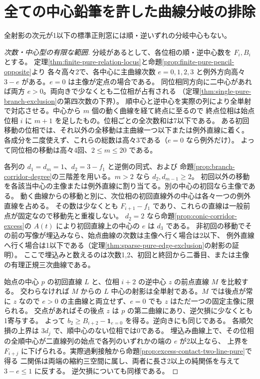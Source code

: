 \section{全ての中心鉛筆を許した曲線分岐の排除}
\label{sec:unrestricted-corridor-exclusion}
\begin{theorem}\label{thm:unrestricted-corridor-exclusion}
全射影の次元が1以下の標準正則窓には順・逆いずれの分岐中心もない。
\end{theorem}
\begin{proof}[次数・中心型の有限な範囲]
分岐があるとして、各位相の順・逆中心数を $F_i,B_i$ とする。
定理\ref{thm:finite-pure-relation-locus}と命題\ref{prop:finite-pure-pencil-opposite}より
各々高々2で、各中心に主曲線次数 $e=0,1,2,3$ と例外方向高々 $3-e$ がある。$e=0$ は主像が定点の場合である。
同位相同方向に二中心があれば両方 $e>0$。両向きで少なくとも二位相が占有される
（定理\ref{thm:single-pure-branch-exclusion}の第四次数の下界）。
順中心と逆中心を実際の列により全単射で対応させる。中心から $m$ 個の動く曲線を経て終点に至るので
終点位相は始点位相 $i$ に $m+1$ を足したもの。位相ごとの全次数和は7以下である。
ある初回移動の位相では、それ以外の全移動は主曲線一つ以下または例外直線に着く。
各成分を二度使えず、これらの総数は高々3である（$e=0$ なら例外だけ）。
よって同位相の移動は高々4回、$2\le m\le20$ である。

各列の $d_1=d_m=1$、$d_2=3-f_1$ と逆側の同式、および
命題\ref{prop:branch-corridor-degree}の三階差を用いる。$m>2$ なら $d_2,d_{m-1}\ge2$。
初回以外の移動を各該当中心の主像または例外直線に割り当てる。別の中心の初回なら主像である。
動く曲線からの移動と別に、次位相の初回直線外の中心は各々一つの例外直線を占める。
その数は少なくとも $F_{i+1}-f_1$ であり、これらの直線は一般前点が固定なので移動先と重複しない。
$d_2=2$ なら命題\ref{prop:conic-corridor-excess}の $A(t)$ により初回直線上の中心の $e$ は $d_3$ である。
非初回の移動でその前の写像が埋込みなら、始点曲線の次数は主像へ行く場合は2以下、
例外直線へ行く場合は1以下である（定理\ref{thm:sparse-pure-edge-exclusion}の射影の証明）。
ここで埋込みと数えるのは次数1,2、初回と終回から二番目、または主像の有理正規三次曲線である。

始点の中心 $p$ の初回直線 $L$ と、位相 $i+2$ の逆中心 $z$ の前点直線 $M$ を比較する。
交わらなければ $M$ からの $L$ 中心の射影は全単射である。$M$ では後点が常に $z$ なので
$e>0$ の主曲線と両立せず、$e=0$ でも $z$ はただ一つの固定主像に限られる。
交点があればその後点 $z$ は $p$ の第二曲線にあり、逆欠損に少なくとも1寄与する。
よって $b_2\ge B_{i+2}-\mathbf1_{e=0}$ を得る。逆向きにも同じである。
各順欠損の上界は $3d_j$ で、順中心のない位相では0である。
埋込み曲線上で、その位相の全順中心が二直線列の始点で各列のいずれかの端の $e$ が2以上なら、
上界を $F_{i+j}$ に下げられる。実際過剰接触から命題\ref{prop:excess-contact-two-line-pure}で得る
二関係は両端の縮約三空間に属し、両者に長さ2以上の純関係を与えて $3-e\le1$ に反する。
逆欠損についても同様である。
\end{proof}

